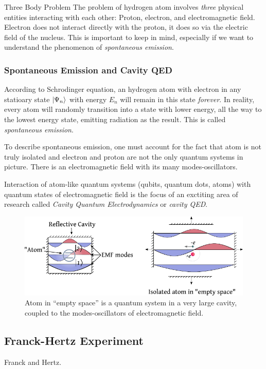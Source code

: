 \begin{mybio}{Three Body Problem}
	The problem of hydrogen atom involves \emph{three} physical entities
	interacting with each other: Proton, electron, and electromagnetic
	field. Electron does not interact directly with the proton, it does
	so via the electric field of the nucleus. This is important to keep
	in mind, especially if we want to understand the phenomenon of
	\emph{spontaneous emission}.
\end{mybio}
\subsubsection{Spontaneous Emission and Cavity QED}
According to Schrodinger equation, an hydrogen atom with electron in any
statioary state $|{\Psi_n}\rangle$ with energy $E_n$ will remain in this
state \emph{forever}. In reality, every atom will randomly transition
into a state with lower energy, all the way to the lowest energy
state, emitting radiation as the result. This is called \emph{spontaneous
	emission}.

To describe spontaneous emission, one must account for the fact that
atom is not truly isolated and electron and proton are not the only
quantum systems in picture. There is an electromagnetic field with its
many modes-oscillators.

Interaction of atom-like quantum systems (qubits, quantum dots, atoms)
with quantum states of electromagnetic field is the focus of an exctiting
area of research called \emph{Cavity Quantum Electrodynamics} or \emph{cavity QED}.
\begin{figure}[htbp]
	\centering
	\includegraphics[scale=1.0]{cavityQED}
	\caption{Atom in ``empty space'' is a quantum system in a very large
		cavity, coupled to the modes-oscillators of electromagnetic field.}
	\label{fig:cavityQED}
\end{figure}

\subsection{Franck-Hertz Experiment}
Franck and Hertz.

